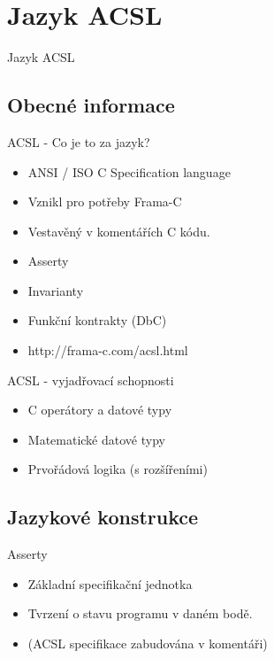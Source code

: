 \documentclass[11pt]{beamer}
\begin{document}
\section{Jazyk ACSL}

\begin{frame}{Jazyk ACSL}

\end{frame}

\subsection{Obecné informace}

\begin{frame}{ACSL - Co je to za jazyk?}
\begin{itemize}
	\item ANSI / ISO C Specification language
	\item Vznikl pro potřeby Frama-C
	\item Vestavěný v komentářích C kódu.
	\item Asserty
	\item Invarianty
	\item Funkční kontrakty (DbC)
	\item http://frama-c.com/acsl.html
\end{itemize}
\end{frame}

\begin{frame}{ACSL - vyjadřovací schopnosti}
\begin{itemize}
	\item C operátory a datové typy
	\item Matematické datové typy
	\item Prvořádová logika (s rozšířeními)
\end{itemize}
\end{frame}


\subsection{Jazykové konstrukce}


\begin{frame}{Asserty}
\lstBasicAssert
\begin{itemize}
	\item Základní specifikační jednotka
	\item Tvrzení o stavu programu v daném bodě.
	\item (ACSL specifikace zabudována v komentáři)
\end{itemize}
\end{frame}
\end{document}
